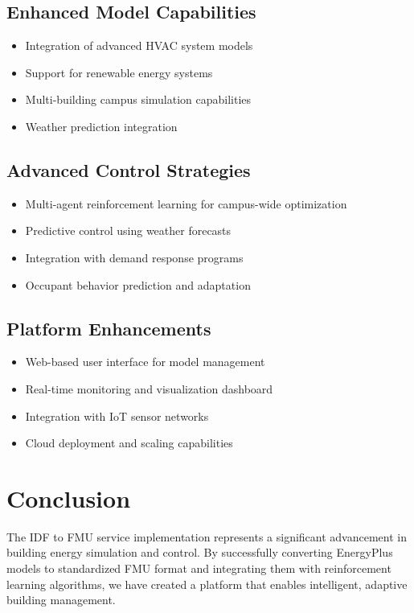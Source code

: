 \documentclass[12pt,a4paper]{article}
\begin{document}
{{\subsection{Enhanced Model Capabilities}

\begin{itemize}
    \item Integration of advanced HVAC system models
    \item Support for renewable energy systems
    \item Multi-building campus simulation capabilities
    \item Weather prediction integration
\end{itemize}

\subsection{Advanced Control Strategies}

\begin{itemize}
    \item Multi-agent reinforcement learning for campus-wide optimization
    \item Predictive control using weather forecasts
    \item Integration with demand response programs
    \item Occupant behavior prediction and adaptation
\end{itemize}

\subsection{Platform Enhancements}

\begin{itemize}
    \item Web-based user interface for model management
    \item Real-time monitoring and visualization dashboard
    \item Integration with IoT sensor networks
    \item Cloud deployment and scaling capabilities
\end{itemize}

\section{Conclusion}

The IDF to FMU service implementation represents a significant advancement in building energy simulation and control. By successfully converting EnergyPlus models to standardized FMU format and integrating them with reinforcement learning algorithms, we have created a platform that enables intelligent, adaptive building management.

}}
\end{document}
